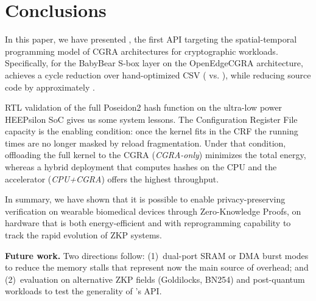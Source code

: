 \section{Conclusions}
\label{sec:conclusion}

In this paper, we have presented \castm{}, the first API targeting the spatial-temporal programming model of CGRA architectures for cryptographic workloads. Specifically, for the BabyBear S-box layer on the  OpenEdgeCGRA architecture, \castm{} achieves a \pct{\MetricSboxCastmCycleReductionPct} cycle reduction over hand-optimized CSV (\cc{\MetricSboxCastmCC} vs. \cc{\MetricSboxManualCC}), while reducing source code by approximately \timex{\MetricLocCompressionVsManual}.

RTL validation of the full Poseidon2 hash function on the ultra-low power HEEPsilon SoC gives us some system lessons. The Configuration Register File capacity is the enabling condition: once the kernel fits in the CRF the running times are no longer masked by reload fragmentation. Under that condition,
offloading the full kernel to the CGRA (\textit{CGRA-only}) minimizes the total energy, whereas a hybrid deployment that computes hashes on the CPU and the accelerator (\textit{CPU+CGRA}) offers the highest throughput.

In summary, we have shown that it is possible to enable privacy-preserving verification on wearable biomedical devices through Zero-Knowledge Proofs, on hardware that is both energy-efficient and with reprogramming capability to track the rapid evolution of ZKP systems.

\textbf{Future work.} Two directions follow: (1)~dual-port SRAM or DMA burst modes to reduce the memory stalls that represent now the main source of overhead;
and (2)~evaluation on alternative ZKP fields (Goldilocks, BN254) and post-quantum workloads to test the generality of \castm{}'s API.

